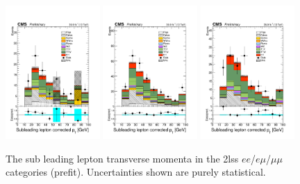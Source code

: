 \begin{figure}[htp]
\centering
\includegraphics[width=0.32\textwidth]{ch5_figs/l2_pt_ttH_ee_stackPlot_SR.pdf}
\includegraphics[width=0.32\textwidth]{ch5_figs/l2_pt_ttH_em_stackPlot_SR.pdf}
\includegraphics[width=0.32\textwidth]{ch5_figs/l2_pt_ttH_mm_stackPlot_SR.pdf} \\
\caption[Data/MC comparison of subleading lepton \pt in the signal region]{The sub leading lepton transverse momenta in the 2lss $ee$/$e\mu$/$\mu\mu$ categories (prefit). Uncertainties shown are purely statistical.}
\label{fig:sr_l2pt}
\end{figure}

